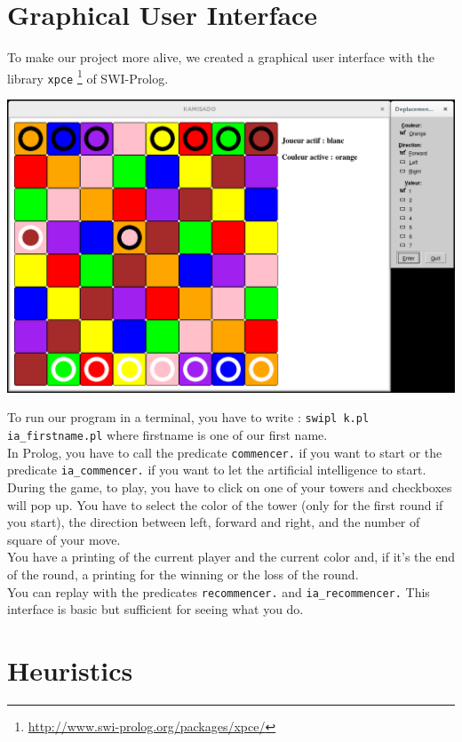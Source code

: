\documentclass[a4paper, 11pt]{article}
\begin{document}
\section{Graphical User Interface}
To make our project more alive, we created a graphical user interface with the library \verb?xpce? \footnote{\url{http://www.swi-prolog.org/packages/xpce/}} of SWI-Prolog.\\
\begin{center}
\includegraphics[scale = 0.25]{kamisado.png}
\end{center}
To run our program in a terminal, you have to write : \verb?swipl k.pl ia_firstname.pl? where firstname is one of our first name.\\
In Prolog, you have to call the predicate \verb?commencer.? if you want to start or the predicate \verb?ia_commencer.? if you want to let the artificial intelligence to start.\\
During the game, to play, you have to click on one of your towers and checkboxes will pop up. You have to select the color of the tower (only for the first round if you start), the direction  between left, forward and right, and the number of square of your move.\\
You have a printing of the current player and the current color and, if it's the end of the round, a printing for the winning or the loss of the round.\\
You can replay with the predicates \verb?recommencer.? and \verb?ia_recommencer.?
This interface is basic but sufficient for seeing what you do.

\section{Heuristics}
\end{document}
